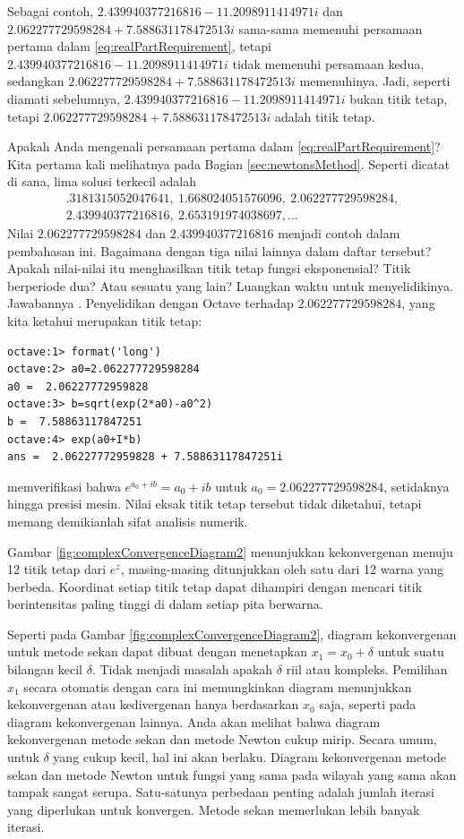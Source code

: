 Sebagai contoh, $2.439940377216816-11.2098911414971i$ dan $2.062277729598284+7.588631178472513i$
sama-sama memenuhi persamaan pertama dalam \ref{eq:realPartRequirement},
tetapi $2.439940377216816-11.2098911414971i$ tidak memenuhi persamaan
kedua, sedangkan $2.062277729598284+7.588631178472513i$ memenuhinya.
Jadi, seperti diamati sebelumnya, $2.439940377216816-11.2098911414971i$
bukan titik tetap, tetapi $2.062277729598284+7.588631178472513i$
adalah titik tetap. 

Apakah Anda mengenali persamaan pertama dalam \ref{eq:realPartRequirement}?
Kita pertama kali melihatnya  pada Bagian
\ref{sec:newtonsMethod}. Seperti dicatat di sana, lima solusi terkecil
adalah
\[
\begin{gathered}.3181315052047641,\ 1.668024051576096,\ 2.062277729598284,\\
2.439940377216816,\ 2.653191974038697,\ldots
\end{gathered}
\]
Nilai $2.062277729598284$ dan $2.439940377216816$ menjadi contoh
dalam pembahasan ini. Bagaimana dengan tiga nilai lainnya dalam daftar
tersebut? Apakah nilai-nilai itu menghasilkan titik tetap fungsi eksponensial?
Titik berperiode dua? Atau sesuatu yang lain? Luangkan waktu untuk
menyelidikinya. Jawabannya . Penyelidikan
dengan Octave terhadap $2.062277729598284$, yang kita ketahui merupakan
titik tetap: \begin{verbatim}
octave:1> format('long')
octave:2> a0=2.062277729598284
a0 =  2.06227772959828
octave:3> b=sqrt(exp(2*a0)-a0^2)
b =  7.58863117847251
octave:4> exp(a0+I*b)
ans =  2.06227772959828 + 7.58863117847251i
\end{verbatim} memverifikasi bahwa $e^{a_{0}+ib}=a_{0}+ib$ untuk $a_{0}=2.062277729598284$,
setidaknya hingga presisi mesin. Nilai eksak titik tetap tersebut
tidak diketahui, tetapi memang demikianlah sifat analisis numerik.

Gambar \ref{fig:complexConvergenceDiagram2} menunjukkan kekonvergenan
menuju 12 titik tetap dari $e^{z}$, masing-masing ditunjukkan oleh
satu dari 12 warna yang berbeda. Koordinat setiap titik tetap dapat
dihampiri dengan mencari titik berintensitas paling tinggi di dalam
setiap pita berwarna. 

Seperti pada Gambar \ref{fig:complexConvergenceDiagram2}, diagram
kekonvergenan untuk metode sekan dapat dibuat dengan menetapkan $x_{1}=x_{0}+\delta$
untuk suatu bilangan kecil $\delta.$ Tidak menjadi masalah apakah
$\delta$ riil atau kompleks. Pemilihan $x_{1}$ secara otomatis dengan
cara ini memungkinkan diagram menunjukkan kekonvergenan atau kedivergenan
hanya berdasarkan $x_{0}$ saja, seperti pada diagram kekonvergenan
lainnya. Anda akan melihat bahwa diagram kekonvergenan metode sekan
dan metode Newton cukup mirip. Secara umum, untuk $\delta$ yang cukup
kecil, hal ini akan berlaku. Diagram kekonvergenan metode sekan dan
metode Newton untuk fungsi yang sama pada wilayah yang sama akan tampak
sangat serupa. Satu-satunya perbedaan penting adalah jumlah iterasi
yang diperlukan untuk konvergen. Metode sekan memerlukan lebih banyak
iterasi.

